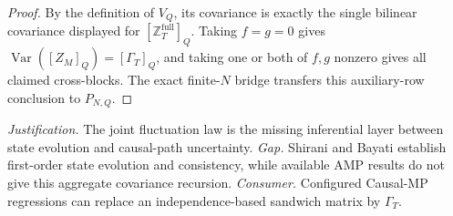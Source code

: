 \documentclass{article}
\begin{document}
\begin{proof}
By the definition of \(V_Q\), its covariance is exactly the single bilinear covariance displayed for \([\mathbb Z_T^{\mathrm{full}}]_Q\).  Taking \(f=g=0\) gives \(\operatorname{Var}([Z_M]_Q)=[\Gamma_T]_Q\), and taking one or both of \(f,g\) nonzero gives all claimed cross-blocks.  The exact finite-\(N\) bridge transfers this auxiliary-row conclusion to \(P_{N,Q}\).
\end{proof}
\par\smallskip\noindent \textit{Justification.} The joint fluctuation law is the missing inferential layer between state evolution and causal-path uncertainty. \textit{Gap.} Shirani and Bayati establish first-order state evolution and consistency, while available AMP results do not give this aggregate covariance recursion. \textit{Consumer.} Configured Causal-MP regressions can replace an independence-based sandwich matrix by \(\Gamma_T\).
\end{document}
